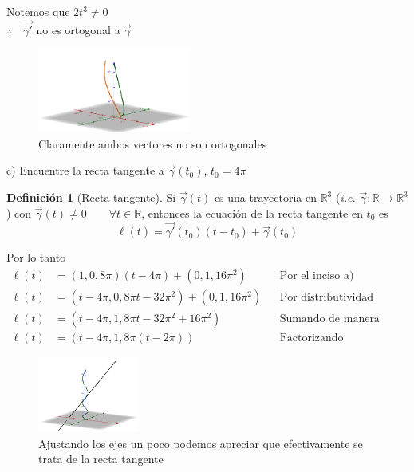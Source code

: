 \documentclass[letterpaper]{article}
\renewcommand{\l}{\ell}
\newcommand{\R}{\mathds{R}}
\renewcommand{\*}{\cdot}
\theoremstyle{definition}
\newtheorem{definition}{Definición}
\begin{document}
 \begin{center}
 Notemos que $ 2t^3 \neq 0 $\\
 $ \therefore \quad \vec{\gamma'}$ no es ortogonal a $ \vec{\gamma} $
 \end{center}
\begin{figure}[h!]
	\centering
	\includegraphics[width=0.45\textwidth]{img/Proyecto4_2.png}
	\caption{Claramente ambos vectores no son ortogonales}
\end{figure}
\noindent c) Encuentre la recta tangente a $\vec{\gamma}(t_0)$,  $t_0 = 4\pi$
\begin{definition}[Recta tangente]
	Si $ \vec{\gamma}(t) $ es una trayectoria en $ \R^3 $ (\textit{i.e. } $ \vec{\gamma} : \R \to \R^3 $) con $ \vec{\gamma}(t) \neq 0 \qquad \forall t \in \R$, entonces la ecuación de la recta tangente en $ t_0 $ es 
	\[  \l(t) = \vec{\gamma'}(t_0)(t-t_0) + \vec{\gamma}(t_0)  \]
\end{definition}
Por lo tanto 
\begin{align*}
	\l(t) &= (1,0,8\pi)(t - 4\pi) + (0,1,16\pi^2) && \text{Por el inciso a)}\\
	\l(t) &= (t - 4\pi,0,8\pi t - 32\pi^2) + (0,1,16\pi^2) && \text{Por distributividad}\\
	\l(t) &= (t - 4\pi,1,8\pi t - 32\pi^2 + 16\pi^2) && \text{Sumando de manera directa}\\
	\l(t) &= (t - 4\pi,1,8\pi( t -  2\pi)) && \text{Factorizando}
\end{align*}

\begin{figure}[h!]
	\centering
	\includegraphics[width=0.3\textwidth]{img/Proyecto4_3.png}
	\caption{\small Ajustando los ejes un poco podemos apreciar que efectivamente se trata de la recta tangente }
\end{figure}
\end{document}
